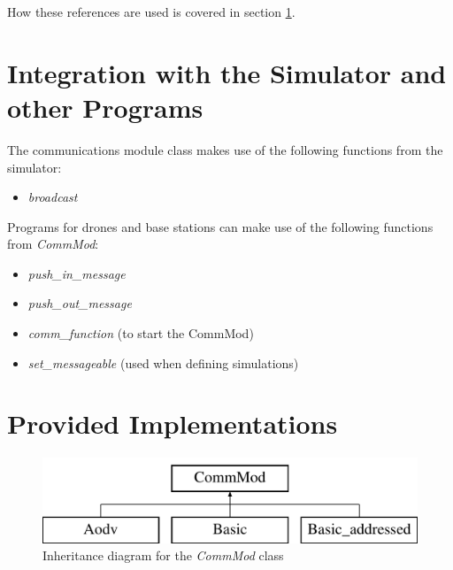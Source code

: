 How these references are used is covered in section \ref{int-sim}.

\section{Integration with the Simulator and other Programs}
\label{int-sim}
The communications module class makes use of the following functions from the simulator:

\begin{itemize}
\item \textit{broadcast}
\end{itemize}

Programs for drones and base stations can make use of the following functions from \textit{CommMod}:

\begin{itemize}
\item \textit{push\_in\_message}
\item \textit{push\_out\_message}
\item \textit{comm\_function} (to start the CommMod)
\item \textit{set\_messageable} (used when defining simulations)
\end{itemize}

\section{Provided Implementations}
\begin{figure}[H]
\centering
\includegraphics[scale=0.4]{../documentation/latex/class_comm_mod}	
\caption{Inheritance diagram for the \textit{CommMod} class}
\end{figure}

